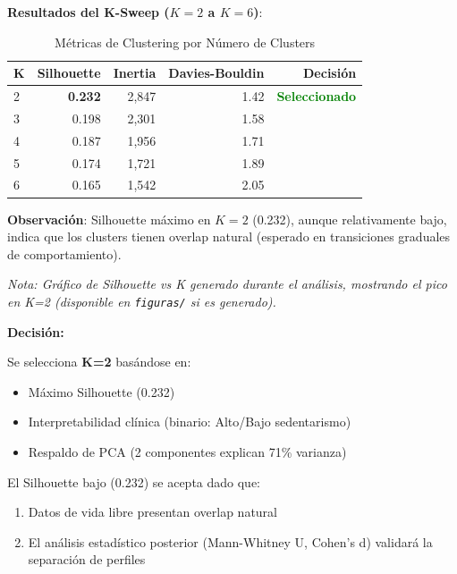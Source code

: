 \documentclass[12pt,letterpaper,twoside]{report}
\begin{document}
\begin{calculobox}
\textbf{Resultados del K-Sweep ($K=2$ a $K=6$)}:

\begin{table}[H]
\centering
\caption{Métricas de Clustering por Número de Clusters}
\label{tab:k_sweep}
\begin{tabular}{@{}lrrrr@{}}
\toprule
\textbf{K} & \textbf{Silhouette} & \textbf{Inertia} & \textbf{Davies-Bouldin} & \textbf{Decisión} \\
\midrule
2 & \textbf{0.232} & 2,847 & 1.42 & \textcolor{green}{\textbf{Seleccionado}} \\
3 & 0.198       & 2,301 & 1.58 & \\
4 & 0.187       & 1,956 & 1.71 & \\
5 & 0.174       & 1,721 & 1.89 & \\
6 & 0.165       & 1,542 & 2.05 & \\
\bottomrule
\end{tabular}
\end{table}

\textbf{Observación}: Silhouette máximo en $K=2$ (0.232), aunque relativamente bajo, indica que los clusters tienen overlap natural (esperado en transiciones graduales de comportamiento).
\end{calculobox}

\textit{Nota: Gráfico de Silhouette vs K generado durante el análisis, mostrando el pico en K=2 (disponible en \texttt{figuras/} si es generado).}

\begin{decisionbox}
\textbf{Decisión:}

Se selecciona \textbf{K=2} basándose en:
\begin{itemize}[noitemsep]
    \item Máximo Silhouette (0.232)
    \item Interpretabilidad clínica (binario: Alto/Bajo sedentarismo)
    \item Respaldo de PCA (2 componentes explican 71\% varianza)
\end{itemize}

El Silhouette bajo (0.232) se acepta dado que:
\begin{enumerate}[noitemsep]
    \item Datos de vida libre presentan overlap natural
    \item El análisis estadístico posterior (Mann-Whitney U, Cohen's d) validará la separación de perfiles
\end{enumerate}
\end{decisionbox}
\end{document}
